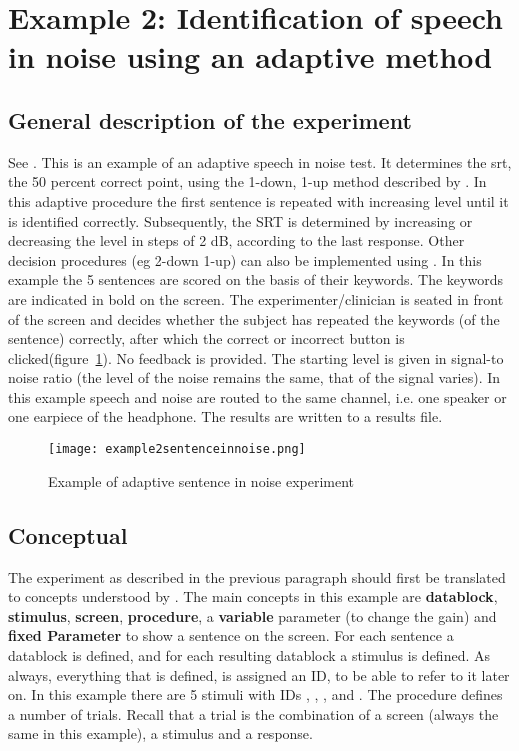 \newpage
\section{Example 2: Identification of speech in noise using an adaptive method}

\subsection{General description of the experiment}
See . This is an
example of an adaptive speech in noise test. It determines the
 \ac{srt}, the 50 percent correct point, using
the 1-down, 1-up method described by \citet{PM79}. In this
adaptive procedure the first sentence is repeated with increasing
level until it is identified correctly. Subsequently, the SRT is
determined by increasing or decreasing the level in steps of 2 dB,
according to the last response. Other decision procedures (eg
2-down 1-up) can also be implemented using \apex. In this example
the 5 sentences are scored on the basis of their keywords. The
keywords are indicated in bold on the screen. The
experimenter/clinician is seated in front of the screen and
decides whether the subject has repeated the keywords (of the
sentence) correctly, after which the correct or incorrect button
is clicked(figure~\ref{fig:sentencenoise}). No feedback is
provided. The starting level is given in signal-to noise ratio
(the level of the noise remains the same, that of the signal
varies). In this example speech and noise are routed to the same
channel, i.e. one speaker or one earpiece of the headphone. The
results are written to a results file.

\begin{figure}
 \centering
 \texttt{[image: example2sentenceinnoise.png]}
 \caption{Example of adaptive sentence in noise experiment}
 \label{fig:sentencenoise} 

\end{figure}
\subsection{Conceptual}
The experiment as described in the previous paragraph should first
be translated to concepts understood by \apex. The main concepts
in this example are \textbf{datablock}, \textbf{stimulus},
\textbf{screen}, \textbf{procedure}, a \textbf{variable} parameter
(to change the gain) and \textbf{fixed Parameter} to show a
sentence on the screen. For each sentence a datablock is defined,
and for each resulting datablock a stimulus is defined. As always,
everything that is defined, is assigned an ID, to be able to refer
to it later on. In this example there are 5 stimuli with IDs
, ,
,  and
. The procedure defines a number of trials.
Recall that a trial is the combination of a screen (always the
same in this example), a stimulus and a response.

